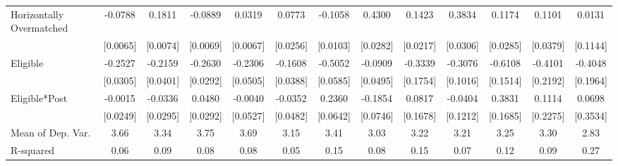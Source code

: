 \begin{table}[htbp]
\begin{tabular}{l*{12}{c}}
\addlinespace
Horizontally Overmatched&     -0.0788\sym{***}&      0.1811\sym{***}&     -0.0889\sym{***}&      0.0319\sym{***}&      0.0773\sym{***}&     -0.1058\sym{***}&      0.4300\sym{***}&      0.1423\sym{***}&      0.3834\sym{***}&      0.1174\sym{***}&      0.1101\sym{***}&      0.0131         \\
                    &    [0.0065]         &    [0.0074]         &    [0.0069]         &    [0.0067]         &    [0.0256]         &    [0.0103]         &    [0.0282]         &    [0.0217]         &    [0.0306]         &    [0.0285]         &    [0.0379]         &    [0.1144]         \\
\addlinespace
Eligible            &     -0.2527\sym{***}&     -0.2159\sym{***}&     -0.2630\sym{***}&     -0.2306\sym{***}&     -0.1608\sym{***}&     -0.5052\sym{***}&     -0.0909\sym{*}  &     -0.3339\sym{*}  &     -0.3076\sym{***}&     -0.6108\sym{***}&     -0.4101\sym{*}  &     -0.4048\sym{**} \\
                    &    [0.0305]         &    [0.0401]         &    [0.0292]         &    [0.0505]         &    [0.0388]         &    [0.0585]         &    [0.0495]         &    [0.1754]         &    [0.1016]         &    [0.1514]         &    [0.2192]         &    [0.1964]         \\
\addlinespace
Eligible*Post       &     -0.0015         &     -0.0336         &      0.0480         &     -0.0040         &     -0.0352         &      0.2360\sym{***}&     -0.1854\sym{**} &      0.0817         &     -0.0404         &      0.3831\sym{**} &      0.1114         &      0.0698         \\
                    &    [0.0249]         &    [0.0295]         &    [0.0292]         &    [0.0527]         &    [0.0482]         &    [0.0642]         &    [0.0746]         &    [0.1678]         &    [0.1212]         &    [0.1685]         &    [0.2275]         &    [0.3534]         \\
\midrule
Mean of Dep. Var.   &        3.66         &        3.34         &        3.75         &        3.69         &        3.15         &        3.41         &        3.03         &        3.22         &        3.21         &        3.25         &        3.30         &        2.83         \\
R-squared           &        0.06         &        0.09         &        0.08         &        0.08         &        0.05         &        0.15         &        0.08         &        0.15         &        0.07         &        0.12         &        0.09         &        0.27         \\

\end{tabular}
\end{table}
